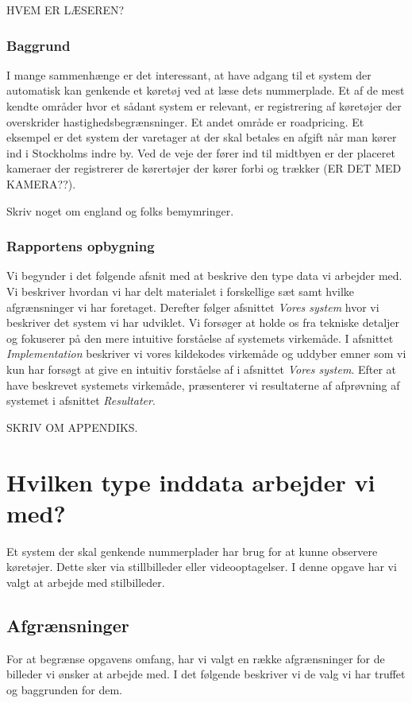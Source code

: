 HVEM ER LÆSEREN?

\subsubsection*{Baggrund}
I mange sammenhænge er det interessant, at have adgang til et system der automatisk kan genkende et køretøj ved at læse dets nummerplade. Et af de mest kendte områder hvor et sådant system er relevant, er registrering af køretøjer der overskrider hastighedsbegrænsninger. Et andet område er roadpricing. Et eksempel er det system der varetager at der skal betales en afgift når man kører ind i Stockholms indre by. Ved de veje der fører ind til midtbyen er der placeret kameraer der registrerer de kørertøjer der kører forbi og trækker (ER DET MED KAMERA??).

Skriv noget om england og folks bemymringer.

\subsubsection*{Rapportens opbygning}
Vi begynder i det følgende afsnit med at beskrive den type data vi arbejder med. Vi beskriver hvordan vi har delt materialet i forskellige sæt samt hvilke afgrænsninger vi har foretaget. Derefter følger afsnittet \textit{Vores system} hvor vi beskriver det system vi har udviklet. Vi forsøger at holde os fra tekniske detaljer og fokuserer på den mere intuitive forståelse af systemets virkemåde. I afsnittet \textit{Implementation} beskriver vi vores kildekodes virkemåde og uddyber emner som vi kun har forsøgt at give en intuitiv forståelse af i afsnittet \textit{Vores system}. Efter at have beskrevet systemets virkemåde, præsenterer vi resultaterne af afprøvning af systemet i afsnittet \textit{Resultater}.

SKRIV OM APPENDIKS.

\section{Hvilken type inddata arbejder vi med?}
\label{sec:data}
Et system der skal genkende nummerplader har brug for at kunne observere køretøjer. Dette sker via stillbilleder eller videooptagelser. I denne opgave har vi valgt at arbejde med stilbilleder.

\subsection{Afgrænsninger}
For at begrænse opgavens omfang, har vi valgt en række afgrænsninger for de billeder vi ønsker at arbejde med. I det følgende beskriver vi de valg vi har truffet og baggrunden for dem.

